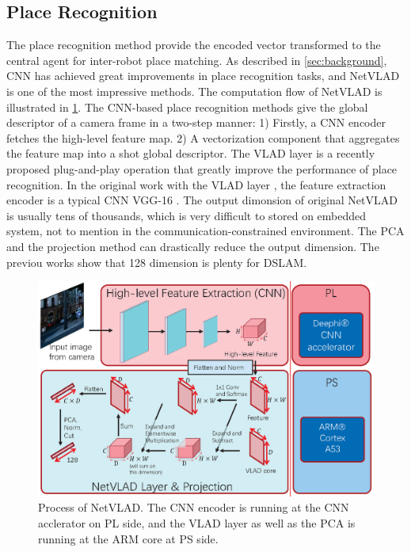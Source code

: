 \subsection{Place Recognition}
The place recognition method provide the encoded vector transformed to the central agent for inter-robot place matching. As described in \cref{sec:background}, CNN has achieved great improvements in place recognition tasks, and NetVLAD \cite{Arandjelovic:2017997} is one of the most impressive methods. The computation flow of NetVLAD is illustrated in \cref{fig:NetVLAD}. The CNN-based place recognition methods give the global descriptor of a camera frame in a two-step manner: 1) Firstly, a CNN encoder fetches the high-level feature map. 2) A vectorization component that aggregates the feature map into a shot global descriptor. The VLAD layer \cite{Arandjelovic:2017997} is a recently proposed plug-and-play operation that greatly improve the performance of place recognition. In the original work with the VLAD layer \cite{Arandjelovic:2017997}, the feature extraction encoder is a typical CNN VGG-16 \cite{Simonyan:20143be}. The output dimonsion of original NetVLAD is usually tens of thousands, which is very difficult to stored on embedded system, not to mention in the communication-constrained environment. The PCA and the projection method can drastically reduce the output dimension. The previou works\cite{Cieslewski:20187ee} show that 128 dimension is plenty for DSLAM.

\begin{figure}[t]
    \centering  
    \includegraphics[width=0.95\linewidth]{fig/NetVLAD.eps}
    \caption{Process of NetVLAD. The CNN encoder is running at the CNN acclerator on PL side, and the VLAD layer as well as the PCA is running at the ARM core at PS side.}
    \label{fig:NetVLAD}
\end{figure}

